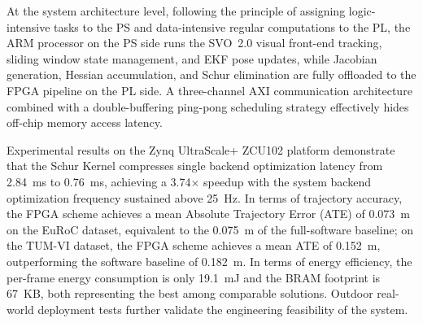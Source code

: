 At the system architecture level, following the principle of assigning logic-intensive tasks to the PS and data-intensive regular computations to the PL, the ARM processor on the PS side runs the SVO~2.0 visual front-end tracking, sliding window state management, and EKF pose updates, while Jacobian generation, Hessian accumulation, and Schur elimination are fully offloaded to the FPGA pipeline on the PL side. A three-channel AXI communication architecture combined with a double-buffering ping-pong scheduling strategy effectively hides off-chip memory access latency.

Experimental results on the Zynq UltraScale+ ZCU102 platform demonstrate that the Schur Kernel compresses single backend optimization latency from 2.84~ms to 0.76~ms, achieving a 3.74$\times$ speedup with the system backend optimization frequency sustained above 25~Hz. In terms of trajectory accuracy, the FPGA scheme achieves a mean Absolute Trajectory Error (ATE) of 0.073~m on the EuRoC dataset, equivalent to the 0.075~m of the full-software baseline; on the TUM-VI dataset, the FPGA scheme achieves a mean ATE of 0.152~m, outperforming the software baseline of 0.182~m. In terms of energy efficiency, the per-frame energy consumption is only 19.1~mJ and the BRAM footprint is 67~KB, both representing the best among comparable solutions. Outdoor real-world deployment tests further validate the engineering feasibility of the system.


\pagestyle{enfrontmatterstyle}%
\cleardoublepage\pagestyle{frontmatterstyle}%

